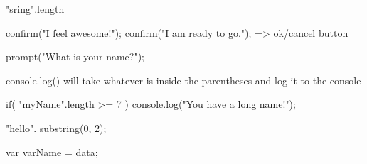 "sring".length

confirm("I feel awesome!");
confirm("I am ready to go.");  => ok/cancel button

prompt("What is your name?");

console.log() will take whatever is inside the parentheses and log it to the console

if( "myName".length >= 7 ) {
    console.log("You have a long name!");
}

"hello". substring(0, 2);

var varName = data;
